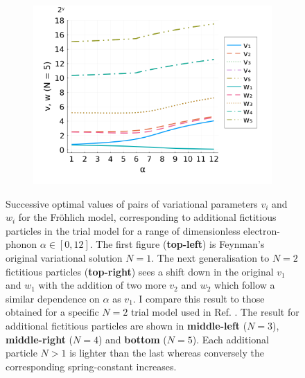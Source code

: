 \begin{figure}[!tbp]
\begin{subfigure}[b]{0.49\textwidth}
    \includegraphics[width=\textwidth]{figures/vw_N5.png}
  \end{subfigure}
  \caption{Successive optimal values of pairs of variational parameters $v_i$ and $w_i$ for the Fr\"ohlich model, corresponding to additional fictitious particles in the trial model for a range of dimensionless electron-phonon $\alpha \in [0, 12]$. The first figure (\textbf{top-left}) is Feynman's original variational solution $N=1$. The next generalisation to $N=2$ fictitious particles (\textbf{top-right}) sees a shift down in the original $v_1$ and $w_1$ with the addition of two more $v_2$ and $w_2$ which follow a similar dependence on $\alpha$ as $v_1$. I compare this result to those obtained for a specific $N=2$ trial model used in Ref. \cite{Abe1971}. The result for additional fictitious particles are shown in \textbf{middle-left} ($N=3$), \textbf{middle-right} ($N=4$) and \textbf{bottom} ($N=5$). Each additional particle $N>1$ is lighter than the last whereas conversely the corresponding spring-constant increases.}
  \label{fig:multivwalpha}
\end{figure}

